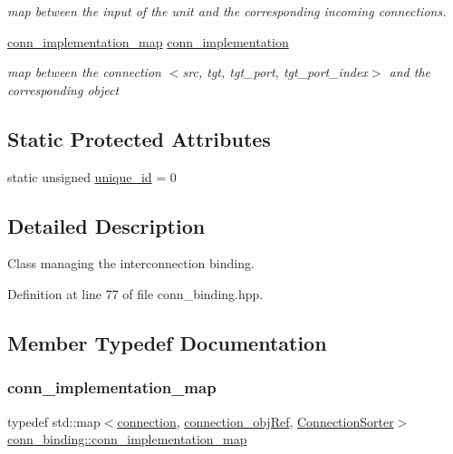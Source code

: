 \begin{DoxyCompactItemize}
\begin{DoxyCompactList}\small\item\em map between the input of the unit and the corresponding incoming connections. \end{DoxyCompactList}\item 
\hyperlink{classconn__binding_a352bfe56b0a7f7b3c9763bf90c87f785}{conn\+\_\+implementation\+\_\+map} \hyperlink{classconn__binding_a029160ea56f0b1c2f3044e467276daa1}{conn\+\_\+implementation}
\begin{DoxyCompactList}\small\item\em map between the connection $<$src, tgt, tgt\+\_\+port, tgt\+\_\+port\+\_\+index$>$ and the corresponding object \end{DoxyCompactList}\end{DoxyCompactItemize}
\subsection*{Static Protected Attributes}
\begin{DoxyCompactItemize}
\item 
static unsigned \hyperlink{classconn__binding_a3c372bf7271e49d0d73a667dafac8449}{unique\+\_\+id} = 0
\end{DoxyCompactItemize}


\subsection{Detailed Description}
Class managing the interconnection binding. 

Definition at line 77 of file conn\+\_\+binding.\+hpp.



\subsection{Member Typedef Documentation}
\mbox{\label{classconn__binding_a352bfe56b0a7f7b3c9763bf90c87f785}} 
\subsubsection{\texorpdfstring{conn\+\_\+implementation\+\_\+map}{conn\_implementation\_map}}
{\footnotesize\ttfamily typedef std\+::map$<$\hyperlink{classconn__binding_aefee92bcc9e59d19b7a3e55e2cbdf615}{connection}, \hyperlink{connection__obj_8hpp_af3c6e389c8543ed97dd9ba412f2c141b}{connection\+\_\+obj\+Ref}, \hyperlink{structconn__binding_1_1ConnectionSorter}{Connection\+Sorter}$>$ \hyperlink{classconn__binding_a352bfe56b0a7f7b3c9763bf90c87f785}{conn\+\_\+binding\+::conn\+\_\+implementation\+\_\+map}}



